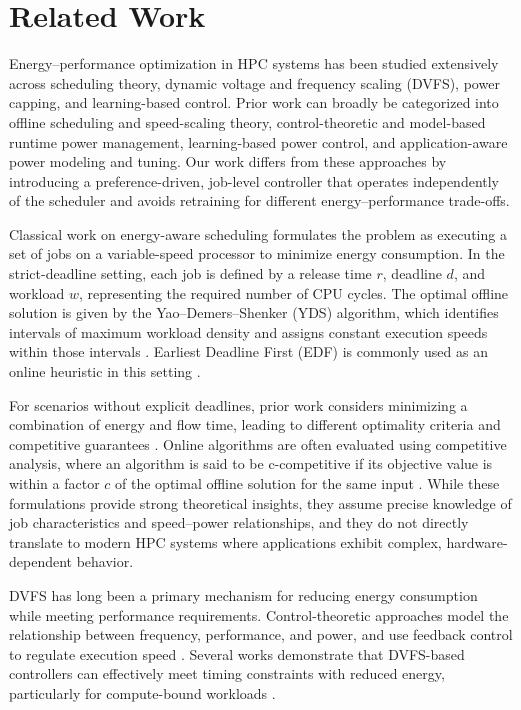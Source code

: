\section{Related Work} \label{sec:Related}
Energy–performance optimization in HPC systems has been studied extensively across scheduling theory, dynamic voltage and frequency scaling (DVFS), power capping, and learning-based control. Prior work can broadly be categorized into offline scheduling and speed-scaling theory, control-theoretic and model-based runtime power management, learning-based power control, and application-aware power modeling and tuning. Our work differs from these approaches by introducing a preference-driven, job-level controller that operates independently of the scheduler and avoids retraining for different energy–performance trade-offs.

Classical work on energy-aware scheduling formulates the problem as executing a set of jobs on a variable-speed processor to minimize energy consumption. In the strict-deadline setting, each job is defined by a release time $r$, deadline $d$, and workload $w$, representing the required number of CPU cycles. The optimal offline solution is given by the Yao–Demers–Shenker (YDS) algorithm, which identifies intervals of maximum workload density and assigns constant execution speeds within those intervals \cite{YDS}. Earliest Deadline First (EDF) is commonly used as an online heuristic in this setting \cite{YDS}.

For scenarios without explicit deadlines, prior work considers minimizing a combination of energy and flow time, leading to different optimality criteria and competitive guarantees \cite{ALBERS20151194}. Online algorithms are often evaluated using competitive analysis, where an algorithm is said to be c-competitive if its objective value is within a factor 
$c$ of the optimal offline solution for the same input \cite{YDS,ALBERS20151194}. While these formulations provide strong theoretical insights, they assume precise knowledge of job characteristics and speed–power relationships, and they do not directly translate to modern HPC systems where applications exhibit complex, hardware-dependent behavior.

DVFS has long been a primary mechanism for reducing energy consumption while meeting performance requirements. Control-theoretic approaches model the relationship between frequency, performance, and power, and use feedback control to regulate execution speed \cite{DVFS_Control, DVFS_optimization}. Several works demonstrate that DVFS-based controllers can effectively meet timing constraints with reduced energy, particularly for compute-bound workloads \cite{DVFS_Control}.

